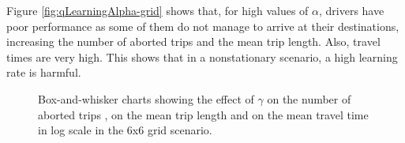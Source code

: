 \documentclass{RITA}
\begin{document}
Figure \ref{fig:qLearningAlpha-grid} shows that, for high values of $\alpha$, drivers have poor performance as some of them do not manage to arrive at their destinations, increasing the number of aborted trips and the mean trip length. Also, travel times are very high. This shows that in a nonstationary scenario, a high learning rate is harmful.

\begin{figure}
  \centering
  \caption{Box-and-whisker charts showing the effect of $\gamma$ on the number of aborted trips , on the mean trip length  and on the mean travel time in log scale  in the 6x6 grid scenario.}
  \label{fig:qLearningGamma-grid}
\end{figure}
\end{document}
